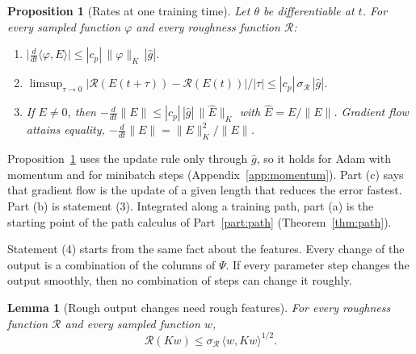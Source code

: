 \documentclass[11pt]{article}
\newtheorem{lemma}{Lemma}
\newtheorem{proposition}{Proposition}
\theoremstyle{definition}
\theoremstyle{remark}
\newcommand{\Rgh}{\mathcal{R}}           %
\newcommand{\sR}{\sigma_{\Rgh}}
\newcommand{\ip}[2]{\langle #1,#2\rangle}
\begin{document}
\begin{proposition}[Rates at one training time]\label{prop:rates}
Let $\theta$ be differentiable at $t$.
For every sampled function $\varphi$ and every roughness function $\Rgh$:
\begin{enumerate}[label=(\alph*)]
\item $\big|\tfrac{d}{dt}\ip{\varphi}{E}\big| \le |c_p|\,\|\varphi\|_K\,|\hat g|$.
\item $\limsup_{\tau\to0}\big|\Rgh(E(t+\tau)) - \Rgh(E(t))\big|/|\tau| \le |c_p|\,\sR\,|\hat g|$.
\item If $E \neq 0$, then $-\tfrac{d}{dt}\|E\| \le |c_p|\,|\hat g|\,\|\hat E\|_K$ with $\hat E = E/\|E\|$. Gradient flow attains equality, $-\tfrac{d}{dt}\|E\| = \|E\|_K^2/\|E\|$.
\end{enumerate}
\end{proposition}

Proposition~\ref{prop:rates} uses the update rule only through $\hat g$, so it holds for Adam with momentum and for minibatch steps (Appendix~\ref{app:momentum}).
Part (c) says that gradient flow is the update of a given length that reduces the error fastest.
Part (b) is statement (3).
Integrated along a training path, part (a) is the starting point of the path calculus of Part~\ref{part:path} (Theorem~\ref{thm:path}).

Statement (4) starts from the same fact about the features.
Every change of the output is a combination of the columns of $\Psi$.
If every parameter step changes the output smoothly, then no combination of steps can change it roughly.

\begin{lemma}[Rough output changes need rough features]\label{lem:mech}
For every roughness function $\Rgh$ and every sampled function $w$,
\begin{equation}\label{eq:mech}
\Rgh(Kw) \le \sR\,\ip{w}{Kw}^{1/2}.
\end{equation}
\end{lemma}
\end{document}
